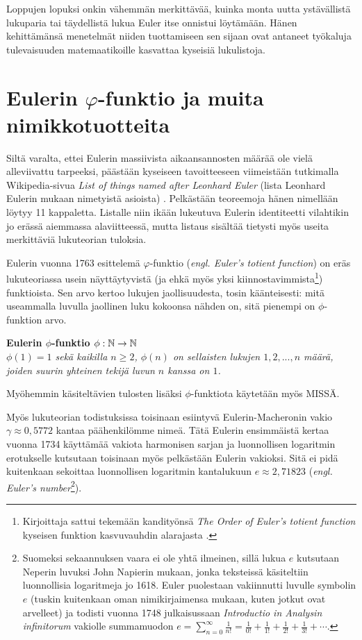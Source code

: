 \documentclass[a4paper,11pt]{article}
\begin{document}
Loppujen lopuksi onkin vähemmän merkittävää, kuinka monta uutta ystävällistä lukuparia tai täydellistä lukua Euler itse onnistui löytämään. Hänen kehittämänsä menetelmät niiden tuottamiseen sen sijaan ovat antaneet työkaluja tulevaisuuden matemaatikoille kasvattaa kyseisiä lukulistoja.

\section{Eulerin $\varphi$-funktio ja muita nimikkotuotteita}
\label{neloi}

Siltä varalta, ettei Eulerin massiivista aikaansannosten määrää ole vielä alleviivattu tarpeeksi, päästään kyseiseen tavoitteeseen viimeistään tutkimalla Wikipedia-sivua \textit{List of things named after Leonhard Euler} (lista Leonhard Eulerin mukaan nimetyistä asioista) \cite{listofthings}. Pelkästään teoreemoja hänen nimellään löytyy 11 kappaletta. Listalle niin ikään lukeutuva Eulerin identiteetti vilahtikin jo erässä aiemmassa alaviitteessä, mutta listaus sisältää tietysti myös useita merkittäviä lukuteorian tuloksia.

Eulerin vuonna 1763 esittelemä $\varphi$-funktio (\textit{engl. Euler's totient function}) \cite{totient} on eräs lukuteoriassa usein näyttäytyvistä (ja ehkä myös yksi kiinnostavimmista\footnote{Kirjoittaja sattui tekemään kandityönsä \textit{The Order of Euler's totient function} kyseisen funktion kasvuvauhdin alarajasta \cite{kandi}.}) funktioista. Sen arvo kertoo lukujen jaollisuudesta, tosin käänteisesti: mitä useammalla luvulla jaollinen luku kokoonsa nähden on, sitä pienempi on $\phi$-funktion arvo.

\begin{center}
    \textbf{Eulerin $\phi$-funktio $\phi: \mathbb{N} \rightarrow \mathbb{N}$}\\
    \textit{$\phi(1)=1$ sekä kaikilla $n\geq2$, $\phi(n)$ on sellaisten lukujen $1,2,...,n$ määrä, joiden suurin yhteinen tekijä luvun $n$ kanssa on $1$.}
\end{center}

Myöhemmin käsiteltävien tulosten lisäksi $\phi$-funktiota käytetään myös MISSÄ. 

Myös lukuteorian todistuksissa toisinaan esiintyvä Eulerin-Macheronin vakio $\gamma\approx0,5772$ kantaa päähenkilömme nimeä. Tätä Eulerin ensimmäistä kertaa vuonna 1734 käyttämää vakiota harmonisen sarjan ja luonnollisen logaritmin erotukselle kutsutaan toisinaan myös pelkästään Eulerin vakioksi. Sitä ei pidä kuitenkaan sekoittaa luonnollisen logaritmin kantalukuun $e\approx2,71823$ (\textit{engl. Euler's number}\footnote{Suomeksi sekaannuksen vaara ei ole yhtä ilmeinen, sillä lukua $e$ kutsutaan Neperin luvuksi John Napierin mukaan, jonka teksteissä käsiteltiin luonnollisia logaritmeja jo 1618. Euler puolestaan vakiinnutti luvulle symbolin $e$ (tuskin kuitenkaan oman nimikirjaimensa mukaan, kuten jotkut ovat arvelleet) ja todisti vuonna 1748 julkaisussaan \textit{Introductio in Analysin infinitorum} vakiolle summamuodon
$e = \sum_{n=0}^\infty\frac{1}{n!}=\frac{1}{0!}+\frac{1}{1!}+\frac{1}{2!}+\frac{1}{3!}+\cdots$\cite{neperinluku}.}).
\end{document}
